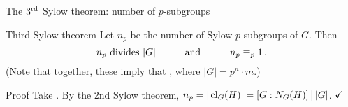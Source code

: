 \documentclass[8pt, handout]{beamer}
\newcommand{\Pause}{}      %
\begin{document}
\begin{frame}{The $3^{\rm rd}$ Sylow theorem: number of $p$-subgroups}

  \begin{block}{Third Sylow theorem}
    Let $n_p$ be the number of Sylow $p$-subgroups of $G$.  Then
    \[
    \mbox{$n_p$ divides $|G|$}\qquad\quad\mbox{and}\qquad\quad
    n_p\equiv_p 1\,. \vspace{-2mm}\Pause
    \]
    (Note that together, these imply that , where
    $|G|=p^n\cdot m$.)
  \end{block}

  \Pause

  \begin{exampleblock}{Proof} %
    Take . By the 2nd Sylow theorem,
    $n_p=|\operatorname{cl}_G(H)|=[G:N_G(H)]\,\big|\,|G|$. $\hfill\checkmark$ \medskip\Pause
    

\end{exampleblock}
\end{frame}
\end{document}
